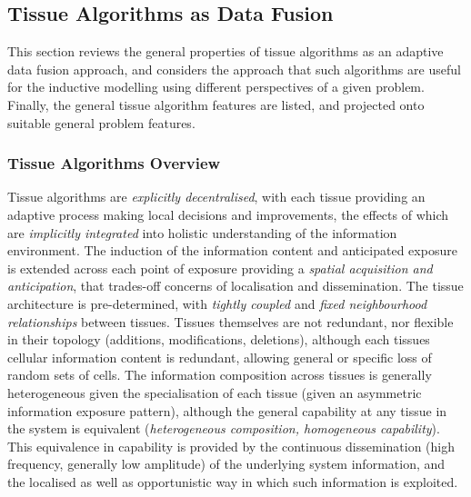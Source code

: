 %
%
\subsection{Tissue Algorithms as Data Fusion}
This section reviews the general properties of tissue algorithms as an adaptive data fusion approach, and considers the approach that such algorithms are useful for the inductive modelling using different perspectives of a given problem. Finally, the general tissue algorithm features are listed, and projected onto suitable general problem features.

%
%
\subsubsection{Tissue Algorithms Overview}
Tissue algorithms are \emph{explicitly decentralised}, with each tissue providing an adaptive process making local decisions and improvements, the effects of which are \emph{implicitly integrated} into holistic understanding of the information environment. The induction of the information content and anticipated exposure is extended across each point of exposure providing a \emph{spatial acquisition and anticipation}, that trades-off concerns of localisation and dissemination. The tissue architecture is pre-determined, with \emph{tightly coupled} and \emph{fixed neighbourhood relationships} between tissues. Tissues themselves are not redundant, nor flexible in their topology (additions, modifications, deletions), although each tissues cellular information content is redundant, allowing general or specific loss of random sets of cells. The information composition across tissues is generally heterogeneous given the specialisation of each tissue (given an asymmetric information exposure pattern), although the general capability at any tissue in the system is equivalent (\emph{heterogeneous composition, homogeneous capability}). This equivalence in capability is provided by the continuous dissemination (high frequency, generally low amplitude) of the underlying system information, and the localised as well as opportunistic way in which such information is exploited.
